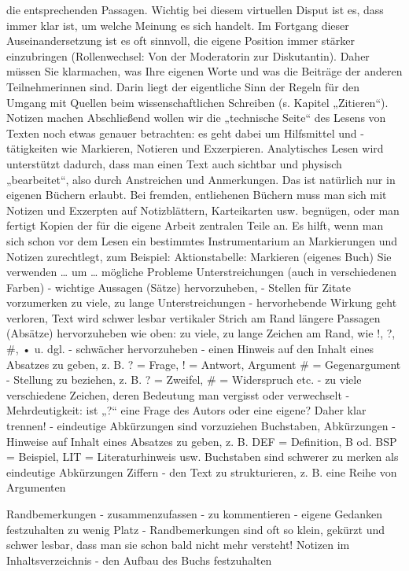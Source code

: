 \documentclass[]{book}
\theoremstyle{definition}
\theoremstyle{definition}
\theoremstyle{definition}
\theoremstyle{remark}
\begin{document}
die entsprechenden Passagen. Wichtig bei diesem virtuellen Disput ist
es, dass immer klar ist, um welche Meinung es sich handelt. Im Fortgang
dieser Auseinandersetzung ist es oft sinnvoll, die eigene Position immer
stärker einzubringen (Rollenwechsel: Von der Moderatorin zur
Diskutantin). Daher müssen Sie klarmachen, was Ihre eigenen Worte und
was die Beiträge der anderen Teilnehmerinnen sind. Darin liegt der
eigentliche Sinn der Regeln für den Umgang mit Quellen beim
wissenschaftlichen Schreiben (s. Kapitel „Zitieren``). Notizen machen
Abschließend wollen wir die „technische Seite`` des Lesens von Texten
noch etwas genauer betrachten: es geht dabei um Hilfsmittel und
-tätigkeiten wie Markieren, Notieren und Exzerpieren. Analytisches Lesen
wird unterstützt dadurch, dass man einen Text auch sichtbar und physisch
„bearbeitet``, also durch Anstreichen und Anmerkungen. Das ist natürlich
nur in eigenen Büchern erlaubt. Bei fremden, entliehenen Büchern muss
man sich mit Notizen und Exzerpten auf Notizblättern, Karteikarten usw.
begnügen, oder man fertigt Kopien der für die eigene Arbeit zentralen
Teile an. Es hilft, wenn man sich schon vor dem Lesen ein bestimmtes
Instrumentarium an Markierungen und Notizen zurechtlegt, zum Beispiel:
Aktionstabelle: Markieren (eigenes Buch) Sie verwenden \ldots{} um
\ldots{} mögliche Probleme Unterstreichungen (auch in verschiedenen
Farben) - wichtige Aussagen (Sätze) hervorzuheben, - Stellen für Zitate
vorzumerken zu viele, zu lange Unterstreichungen - hervorhebende Wirkung
geht verloren, Text wird schwer lesbar vertikaler Strich am Rand längere
Passagen (Absätze) hervorzuheben wie oben: zu viele, zu lange Zeichen am
Rand, wie !, ?, \#, • u. dgl. - schwächer hervorzuheben - einen Hinweis
auf den Inhalt eines Absatzes zu geben, z. B. ? = Frage, ! = Antwort,
Argument \# = Gegenargument - Stellung zu beziehen, z. B. ? = Zweifel,
\# = Widerspruch etc. - zu viele verschiedene Zeichen, deren Bedeutung
man vergisst oder verwechselt - Mehrdeutigkeit: ist „?`` eine Frage des
Autors oder eine eigene? Daher klar trennen! - eindeutige Abkürzungen
sind vorzuziehen Buchstaben, Abkürzungen - Hinweise auf Inhalt eines
Absatzes zu geben, z. B. DEF = Definition, B od. BSP = Beispiel, LIT =
Literaturhinweis usw. Buchstaben sind schwerer zu merken als eindeutige
Abkürzungen Ziffern - den Text zu strukturieren, z. B. eine Reihe von
Argumenten

Randbemerkungen - zusammenzufassen - zu kommentieren - eigene Gedanken
festzuhalten zu wenig Platz - Randbemerkungen sind oft so klein, gekürzt
und schwer lesbar, dass man sie schon bald nicht mehr versteht! Notizen
im Inhaltsverzeichnis - den Aufbau des Buchs festzuhalten
\end{document}
